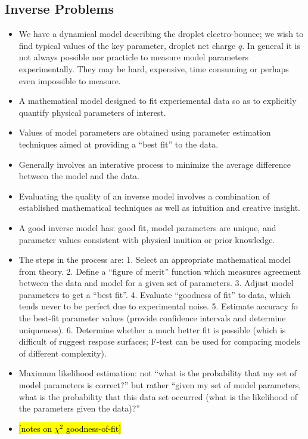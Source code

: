 \documentclass[10pt,a4paper]{article}
\begin{document}
\subsection{Inverse Problems}
\begin{itemize}
\item We have a dynamical model describing the droplet electro-bounce; we wish to find typical values of the key parameter, droplet net charge $q$. In general it is not always possible nor practicle to measure model parameters experimentally. They may be hard, expensive, time consuming or perhaps even impossible to measure. 
\item A mathematical model designed to fit experiemental data so as to explicitly quantify physical parameters of interest.
\item Values of model parameters are obtained using parameter estimation techniques aimed at providing a ``best fit'' to the data.
\item Generally involves an interative process to minimize the average difference between the model and the data.
\item Evaluating the quality of an inverse model involves a combination of established mathematical techniques as well as intuition and creative insight.
\item A good inverse model has: good fit, model parameters are unique, and parameter values consistent with physical inuition or prior knowledge.
\item The steps in the process are: 1. Select an appropriate mathematical model from theory. 2. Define a ``figure of merit'' function which measures agreement between the data and model for a given set of parameters. 3. Adjust model parameters to get a ``best fit''. 4. Evaluate ``goodness of fit'' to data, which tends never to be perfect due to experimental noise. 5. Estimate accuracy fo the best-fit parameter values (provide confidence intervals and determine uniqueness). 6. Determine whether a much better fit is possible (which is difficult of ruggest respose surfaces; F-test can be used for comparing models of different complexity).

\item Maximum likelihood estimation: not ``what is the probability that my set of model parameters is correct?'' but rather ``given my set of model parameters, what is the probability that this data set occurred (what is the likelihood of the parameters given the data)?''

\item \hl{[notes on $\chi^2$ goodness-of-fit]} 


\end{itemize}
\end{document}
